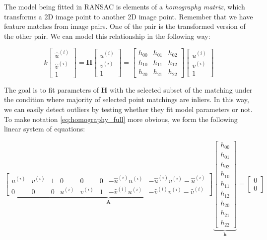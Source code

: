 \documentclass[12pt]{report}
\numberwithin{figure}{section}
\begin{document}
\begin{appendices}
The model being fitted in 
RANSAC \parencite{Fischler1981b} is elements of a \textit{homography matrix}, 
which transforms a 2D 
image point to another 2D image point.  Remember that we have feature matches 
from image pairs. One of the pair is the transformed version of the other 
pair.  We can model this relationship in the following way:

\begin{equation}\label{eq:homography_full}
k
\begin{bmatrix}
\hat{u}^{(i)} \\ \hat{v}^{(i)} \\1
\end{bmatrix}
=
\mathbf{H}
\begin{bmatrix}
u^{(i)} \\ v^{(i)} \\1
\end{bmatrix}
=
\begin{bmatrix}
h_{00} & h_{01} & h_{02} \\
h_{10} & h_{11} & h_{12} \\
h_{20} & h_{21} & h_{22}
\end{bmatrix}
\begin{bmatrix}
u^{(i)} \\ v^{(i)} \\1
\end{bmatrix}
\end{equation}

The goal is to fit parameters of $\mathbf{H}$ with the selected subset of the 
matching under the condition where majority of selected point matchings are 
inliers. In this way, we can easily detect outliers by testing whether they 
fit model parameters or not. To make notation \eqref{eq:homography_full} 
more 
obvious, we form the following linear system of equations:

\begin{equation}
\underbrace{
	\begin{bmatrix}
	u^{(i)} & v^{(i)} & 1 & 0 & 0 & 0 & -\hat{u}^{(i)}u^{(i)} & 
	-\hat{u}^{(i)}v^{(i)} -\hat{u}^{(i)}\\
	0 & 0 & 0 & u^{(i)} & v^{(i)} & 1 & -\hat{v}^{(i)}u^{(i)} & 
	-\hat{v}^{(i)}v^{(i)} -\hat{v}^{(i)}
	\end{bmatrix}}_{\mathbf{A}}
\underbrace{
	\begin{bmatrix}
	h_{00} \\ h_{01} \\ h_{02} \\ h_{10} \\ h_{11} \\ h_{12} \\ h_{20} \\ 
	h_{21} \\ h_{22}
	\end{bmatrix}}_{\mathbf{h}}
= 
\begin{bmatrix}
0\\0
\end{bmatrix}
\end{equation}


\end{appendices}
\end{document}
